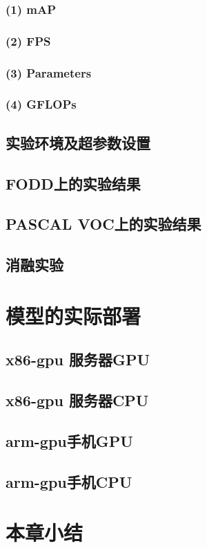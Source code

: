 \subsubsection*{(1) mAP}
\subsubsection*{(2) FPS}
\subsubsection*{(3) Parameters}
\subsubsection*{(4) GFLOPs}
\subsection{实验环境及超参数设置}
\subsection{FODD上的实验结果}
\subsection{PASCAL VOC上的实验结果}
\subsection{消融实验}
\section{模型的实际部署}
\subsection{x86-gpu 服务器GPU}
\subsection{x86-gpu 服务器CPU}
\subsection{arm-gpu手机GPU}
\subsection{arm-gpu手机CPU}
\section{本章小结}












